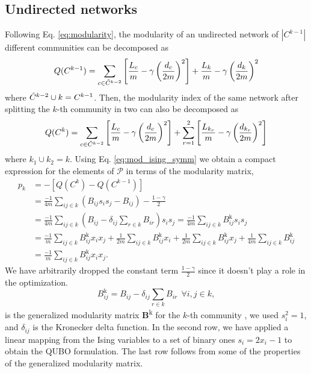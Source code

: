 \documentclass[pdflatex,sn-mathphys-num]{sn-jnl}%
\begin{document}
\subsection*{Undirected networks}
Following Eq. \ref{eq:modularity}, the modularity of an undirected network of $|C^{k-1}|$ different communities can be decomposed as 
$$ Q(C^{k-1}) = \sum_{c \in \Tilde{C}^{k-2}} \left[ \frac{L_c}{m} - \gamma \left(\frac{d_c}{2m}\right)^2\right] + \frac{L_k}{m} - \gamma \left(\frac{d_k}{2m}\right)^2 $$ where $\Tilde{C}^{k-2} \cup k = C^{k-1}$. Then, the modularity index of the same network after splitting the $k$-th community in two can also be decomposed as
$$ Q(C^{k}) = \sum_{c \in \Tilde{C}^{k-2}} \left[ \frac{L_c}{m} - \gamma \left(\frac{d_c}{2m}\right)^2\right] + \sum_{r=1}^{2} \left[ \frac{L_{k_{r}}}{m} - \gamma \left(\frac{d_{k_{r}}}{2m}\right)^2 \right]$$ where $k_1 \cup k_2 = k$. Using Eq. \ref{eq:mod_ising_symm} we obtain a compact expression for the elements of $\mathcal{P}$ in terms of the modularity matrix,
\begin{equation} \label{eq:pk_symm}
    \begin{split}
        p_k &= -\left[ Q(C^{k}) - Q(C^{k-1}) \right]\\
        &= \frac{-1}{4m} \sum_{ij \in k} \left( B_{ij}s_i s_j - B_{ij}\right) - \frac{1-\gamma}{2} \\
        &= \frac{-1}{4m} \sum_{ij \in k} \left( B_{ij} - \delta_{ij} \sum_{r\in k} B_{ir}\right)s_i s_j = \frac{-1}{4m} \sum_{ij \in k} B_{ij}^{\text{k}} s_i s_j \\
        &= \frac{-1}{m} \sum_{ij \in k} B_{ij}^{\text{k}} x_i x_j + \frac{1}{2m} \sum_{ij \in k} B_{ij}^{\text{k}} x_i + \frac{1}{2m} \sum_{ij \in k} B_{ij}^{\text{k}} x_j + \frac{1}{4m} \sum_{ij \in k} B_{ij}^{\text{k}} \\
        &= \frac{-1}{m} \sum_{ij \in k} B_{ij}^{\text{k}} x_i x_j.
    \end{split}
\end{equation} We have arbitrarily dropped the constant term $\frac{1-\gamma}{2}$ since it doesn't play a role in the optimization.  
\begin{equation} \label{eq:gen_mod_matrix}
    B_{ij}^{\text{k}} = B_{ij} - \delta_{ij} \sum_{r\in k} B_{ir} \ \ \forall i,j \in k,
\end{equation} is the generalized modularity matrix \textbf{B}\textsuperscript{k} for the $k$-th community \cite{Newman2006}, we used $s_i^2=1$, and $\delta_{ij}$ is the Kronecker delta function. In the second row, we have applied a linear mapping from the Ising variables to a set of binary ones $s_i=2x_i-1$ to obtain the QUBO formulation. The last row follows from some of the properties of the generalized modularity matrix.
\end{document}
